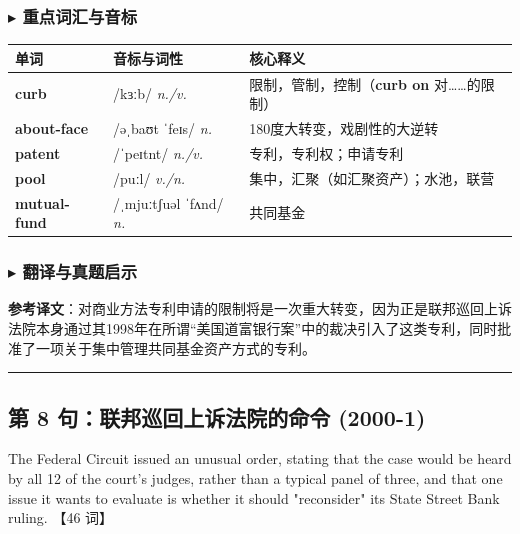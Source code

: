 \documentclass[cn,normal,11pt]{elegantnote}
\newcommand{\retrokey}[1]{{\color{accentcolor}\textbf{#1}}}
\renewcommand{\citshape}{\kaishu\fontspec{Arial}}
\begin{document}
\subsubsection*{$\blacktriangleright$ 重点词汇与音标}
\noindent
\begin{tabularx}{\textwidth}{l X p{7cm}}
  \toprule
  \textbf{单词} & \textbf{音标与词性} & \textbf{核心释义} \\
  \midrule
  \retrokey{curb} & {\citshape /kɜːb/} \textit{n./v.} & 限制，管制，控制（\textbf{curb on} 对……的限制） \\
  \midrule
  \retrokey{about-face} & {\citshape /əˌbaʊt ˈfeɪs/} \textit{n.} & 180度大转变，戏剧性的大逆转 \\
  \midrule
  \retrokey{patent} & {\citshape /ˈpeɪtnt/} \textit{n./v.} & 专利，专利权；申请专利 \\
  \midrule
  \retrokey{pool} & {\citshape /puːl/} \textit{v./n.} & 集中，汇聚（如汇聚资产）；水池，联营 \\
  \midrule
  \retrokey{mutual-fund} & {\citshape /ˌmjuːtʃuəl ˈfʌnd/} \textit{n.} & 共同基金 \\
  \bottomrule
\end{tabularx}

\subsubsection*{$\blacktriangleright$ 翻译与真题启示}
\begin{remark}
  \textbf{参考译文}：对商业方法专利申请的限制将是一次重大转变，因为正是联邦巡回上诉法院本身通过其1998年在所谓“美国道富银行案”中的裁决引入了这类专利，同时批准了一项关于集中管理共同基金资产方式的专利。
\end{remark}

\par\vspace{10pt}\hrule\vspace{10pt}

\subsection{第 8 句：联邦巡回上诉法院的命令 (2000-1)}

\begin{note}
  The Federal Circuit issued an unusual order, stating that the case would be heard by all 12 of the court's judges, rather than a typical panel of three, and that one issue it wants to evaluate is whether it should "reconsider" its State Street Bank ruling. 【46 词】
\end{note}
\end{document}
